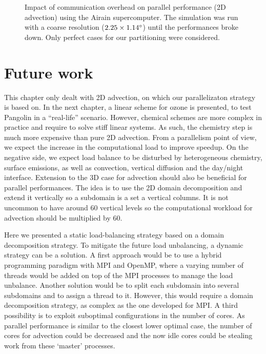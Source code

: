 \begin{figure}
  \hfill
  \caption{%
    Impact of communication overhead on parallel performance (2D advection)
    using the Airain supercomputer. The simulation was run with a coarse
    resolution ($2.25\times1.14^{\circ}$) until the performances broke
    down. Only perfect cases for our partitioning were considered.}
\end{figure}

\section{Future work}
\label{sec:future_work}
This chapter only dealt with 2D advection, on which our parallelizaton strategy is
based on.  In the next chapter, a linear scheme for ozone is presented, to test
Pangolin in a ``real-life'' scenario. However, chemical schemes are more complex
in practice and require to solve stiff linear systems. As such, the chemistry
step is much more expensive than pure 2D advection. From a parallelism point of
view, we expect the increase in the computational load to improve speedup. On
the negative side, we expect load balance to be disturbed by heterogeneous
chemistry, surface emissions, as well as convection, vertical diffusion and the
day/night interface.  Extension to the 3D case for advection should also be
beneficial for parallel performances. The idea is to use the 2D domain
decomposition and extend it vertically so a subdomain is a set a vertical
columns. It is not uncommon to have around 60 vertical levels so the
computational workload for advection should be multiplied by 60. 

Here we presented a static load-balancing strategy based on a domain
decomposition strategy. To mitigate the future load unbalancing, a dynamic
strategy can be a solution. A first approach would be to use a hybrid programming
paradigm with MPI and OpenMP, where a varying number of threads would be added
on top of the MPI processes to manage the load unbalance. Another solution would
be to split each subdomain into several subdomains and to assign a thread to it.
However, this would require a domain decomposition strategy, as complex as the
one developed for MPI\@. A third possibility is to exploit suboptimal
configurations in the number of cores. As parallel performance is similar to the
closest lower optimal case, the number of cores for advection could be decreased
and the now idle cores could be stealing work from these
`master' processes.

